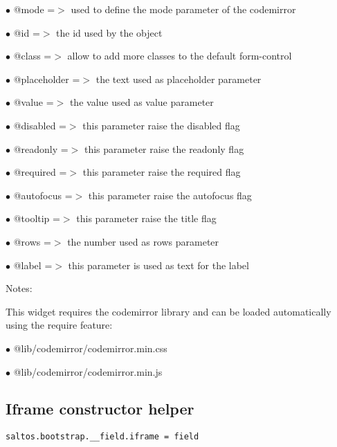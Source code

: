 \documentclass[a4paper]{book}
\begin{document}
\begin{compactitem}
\item[\color{myblue}$\bullet$] @mode        =$>$ used to define the mode parameter of the codemirror
\item[\color{myblue}$\bullet$] @id          =$>$ the id used by the object
\item[\color{myblue}$\bullet$] @class       =$>$ allow to add more classes to the default form-control
\item[\color{myblue}$\bullet$] @placeholder =$>$ the text used as placeholder parameter
\item[\color{myblue}$\bullet$] @value       =$>$ the value used as value parameter
\item[\color{myblue}$\bullet$] @disabled    =$>$ this parameter raise the disabled flag
\item[\color{myblue}$\bullet$] @readonly    =$>$ this parameter raise the readonly flag
\item[\color{myblue}$\bullet$] @required    =$>$ this parameter raise the required flag
\item[\color{myblue}$\bullet$] @autofocus   =$>$ this parameter raise the autofocus flag
\item[\color{myblue}$\bullet$] @tooltip     =$>$ this parameter raise the title flag
\item[\color{myblue}$\bullet$] @rows        =$>$ the number used as rows parameter
\item[\color{myblue}$\bullet$] @label       =$>$ this parameter is used as text for the label
\end{compactitem}

Notes:

This widget requires the codemirror library and can be loaded automatically using the require
feature:

\begin{compactitem}
\item[\color{myblue}$\bullet$] @lib/codemirror/codemirror.min.css
\item[\color{myblue}$\bullet$] @lib/codemirror/codemirror.min.js
\end{compactitem}

\hypertarget{toc446}{}
\subsection{Iframe constructor helper}

\begin{lstlisting}
saltos.bootstrap.__field.iframe = field
\end{lstlisting}
\end{document}
